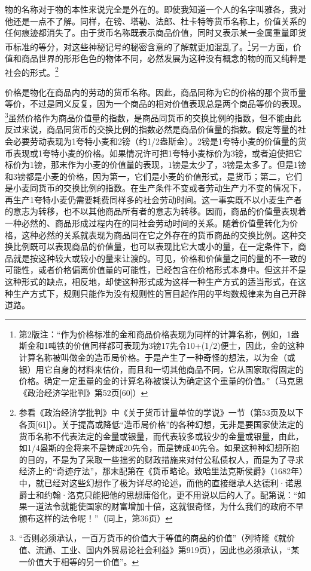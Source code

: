 \documentclass{ctexbook}
\begin{document}
    物的名称对于物的本性来说完全是外在的。即使我知道一个人的名字叫雅各，我对他还是一点不了解。同样，在镑、塔勒、法郎、杜卡特等货币名称上，价值关系的任何痕迹都消失了。由于货币名称既表示商品价值，同时又表示某一金属重量即货币标准的等分，对这些神秘记号的秘密含意的了解就更加混乱了。\footnote{第2版注：“作为价格标准的金和商品价格表现为同样的计算名称，例如，1盎斯金和1吨铁的价值同样都可表现为3镑17先令10+(1/2)便士，因此，金的这种计算名称被叫做金的造币局价格。于是产生了一种奇怪的想法，以为金（或银）用它自身的材料来估价，而且和一切其他商品不同，它从国家取得固定的价格。确定一定重量的金的计算名称被误认为确定这个重量的价值。”（马克思《政治经济学批判》第52页[60]）}另一方面，价值和商品世界的形形色色的物体不同，必然发展为这种没有概念的物的而又纯粹是社会的形式。\footnote{参看《政治经济学批判》中《关于货币计量单位的学说》一节（第53页及以下各页[61]）。关于提高或降低“造币局价格”的各种幻想，无非是要国家使法定的货币名称不代表法定的金量或银量，而代表较多或较少的金量或银量，由此，如1/4盎斯的金将来不是铸成20先令，而是铸成40先令。如果这种种幻想所抱的目的，不是为了采取一些拙劣的财政措施来对付公私债权人，而是为了寻求经济上的“奇迹疗法”，那末配第在《货币略论。致哈里法克斯侯爵》（1682年）中，就已经对这些幻想作了极为详尽的论述，而他的直接继承人达德利·诺思爵士和约翰·洛克只能把他的思想庸俗化，更不用说以后的人了。配第说：“如果一道法令就能使国家的财富增加十倍，这就很奇怪，为什么我们的政府不早颁布这样的法令呢！”（同上，第36页）}

    价格是物化在商品内的劳动的货币名称。因此，商品同称为它的价格的那个货币量等价，不过是同义反复，因为一个商品的相对价值表现总是两个商品等价的表现。\footnote{“否则必须承认，一百万货币的价值大于等值的商品的价值”（列特隆《就价值、流通、工业、国内外贸易论社会利益》第919页），因此也必须承认，“某一价值大于相等的另一价值”。}虽然价格作为商品价值量的指数，是商品同货币的交换比例的指数，但不能由此反过来说，商品同货币的交换比例的指数必然是商品价值量的指数。假定等量的社会必要劳动表现为1夸特小麦和2镑（约1/2盎斯金）。2镑是1夸特小麦的价值量的货币表现或1夸特小麦的价格。如果情况许可把1夸特小麦标价为3镑，或者迫使把它标价为1镑，那末作为小麦的价值量的表现，1镑是太少了，3镑是太多了。但是1镑和3镑都是小麦的价格，因为第一，它们是小麦的价值形式，是货币；第二，它们是小麦同货币的交换比例的指数。在生产条件不变或者劳动生产力不变的情况下，再生产1夸特小麦仍需要耗费同样多的社会劳动时间。这一事实既不以小麦生产者的意志为转移，也不以其他商品所有者的意志为转移。因而，商品的价值量表现着一种必然的、商品形成过程内在的同社会劳动时间的关系。随着价值量转化为价格，这种必然的关系就表现为商品同在它之外存在的货币商品的交换比例。这种交换比例既可以表现商品的价值量，也可以表现比它大或小的量，在一定条件下，商品就是按这种较大或较小的量来让渡的。可见，价格和价值量之间的量的不一致的可能性，或者价格偏离价值量的可能性，已经包含在价格形式本身中。但这并不是这种形式的缺点，相反地，却使这种形式成为这样一种生产方式的适当形式，在这种生产方式下，规则只能作为没有规则性的盲目起作用的平均数规律来为自己开辟道路。
\end{document}
